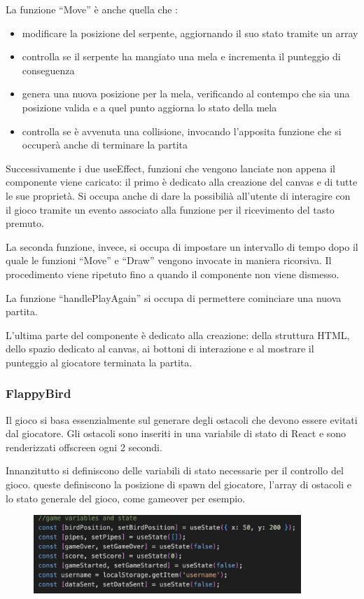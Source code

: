 \documentclass{article}
\begin{document}
La funzione “Move” è anche quella che :
\begin{itemize}
    \item modificare la posizione del serpente, aggiornando il suo stato tramite un array
    \item controlla se il serpente ha mangiato una mela e incrementa il punteggio di conseguenza
    \item genera una nuova posizione per la mela, verificando al contempo che sia una posizione valida e a quel punto aggiorna lo stato della mela
    \item controlla se è avvenuta una collisione, invocando l’apposita funzione che si occuperà anche di terminare la partita
\end{itemize}

Successivamente i due useEffect, funzioni che vengono lanciate non appena il componente viene caricato: il primo è dedicato alla creazione del canvas e di tutte le sue proprietà.
Si occupa anche di dare la possibilià all’utente di interagire con il gioco tramite un evento associato alla funzione per il ricevimento del tasto premuto.

La seconda funzione, invece, si occupa di impostare un intervallo di tempo dopo il quale le funzioni “Move” e “Draw” vengono invocate in maniera ricorsiva.
Il procedimento viene ripetuto fino a quando il componente non viene dismesso.

La funzione “handlePlayAgain” si occupa di permettere cominciare una nuova partita.

L’ultima parte del componente è dedicato alla creazione: della struttura HTML, dello spazio dedicato al canvas, ai bottoni di interazione e al mostrare il punteggio al giocatore terminata la partita.



\subsubsection{FlappyBird}
Il gioco si basa essenzialmente sul generare degli ostacoli che devono essere evitati dal giocatore. 
Gli ostacoli sono inseriti in una variabile di stato di React e sono renderizzati offscreen ogni 2 secondi.

Innanzitutto si definiscono delle variabili di stato necessarie per il controllo del gioco.
queste definiscono la posizione di spawn del giocatore, l'array di ostacoli e lo stato generale del gioco, come gameover per esempio.
\begin{figure}[H]
    \centering
    \includegraphics[width=0.9\textwidth]{images/Flappy_variables.png}
\end{figure}
\end{document}
